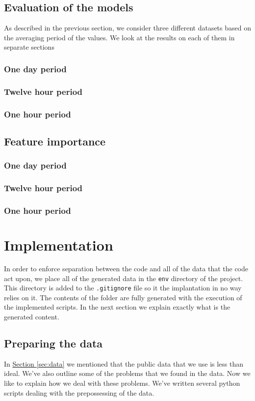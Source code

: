\documentclass[12pt,a4paper,twoside]{scrartcl}
\numberwithin{equation}{section}
\newcommand{\refsec}[1]{\hyperref[#1]{Section \ref*{#1}}}
\begin{document}
\subsection{Evaluation of the models}
\label{sec:eval-model}
As described in the previous section, we consider three different datasets based on the averaging period of the values. We look at the results on each of them in separate sections
\subsubsection{One day period}
\subsubsection{Twelve hour period}
\subsubsection{One hour period}
\subsection{Feature importance}
\subsubsection{One day period}
\subsubsection{Twelve hour period}
\subsubsection{One hour period}
\section{Implementation}
\label{sec:impl}
In order to enforce separation between the code and all of the data that the code act upon, we place all of the generated data in the \texttt{env} directory of the project. This directory is added to the \texttt{.gitignore} file so it the implantation in no way relies on it. The contents of the folder are fully generated with the execution of the implemented scripts. In the next section we explain exactly what is the generated content.
\subsection{Preparing the data}
\label{sec:prep-data}
In \refsec{sec:data} we mentioned that the public data that we use is less than ideal. We've also outline some of the problems that we found in the data. Now we like to explain how we deal with these problems. We've written several python scripts dealing with the prepossessing of the data. 
\end{document}
